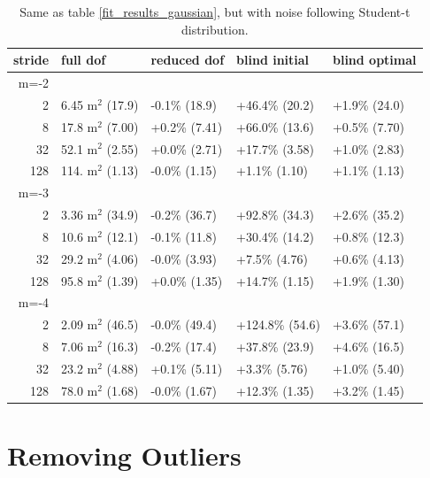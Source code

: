 \documentclass[10pt,journal]{IEEEtran}
\begin{document}
\begin{table}[ht]
\caption{Same as table \ref{fit_results_gaussian}, but with noise following Student-t distribution.}
\label{fit_results_tdistribution}
\centering
\begin{tabular}{r | llll} stride & full dof & reduced dof & blind initial & blind optimal \\ \hline \hline 
m=-2 &&&&  \\ \hline 
2 & 6.45 m$^2$ (17.9) &  -0.1\% (18.9) &  +46.4\% (20.2) &  +1.9\% (24.0) \\ 
8 & 17.8 m$^2$ (7.00) &  +0.2\% (7.41) &  +66.0\% (13.6) &  +0.5\% (7.70) \\ 
32 & 52.1 m$^2$ (2.55) &  +0.0\% (2.71) &  +17.7\% (3.58) &  +1.0\% (2.83) \\ 
128 & 114. m$^2$ (1.13) &  -0.0\% (1.15) &  +1.1\% (1.10) &  +1.1\% (1.13) \\ 
m=-3 &&&&  \\ \hline 
2 & 3.36 m$^2$ (34.9) &  -0.2\% (36.7) &  +92.8\% (34.3) &  +2.6\% (35.2) \\ 
8 & 10.6 m$^2$ (12.1) &  -0.1\% (11.8) &  +30.4\% (14.2) &  +0.8\% (12.3) \\ 
32 & 29.2 m$^2$ (4.06) &  -0.0\% (3.93) &  +7.5\% (4.76) &  +0.6\% (4.13) \\ 
128 & 95.8 m$^2$ (1.39) &  +0.0\% (1.35) &  +14.7\% (1.15) &  +1.9\% (1.30) \\ 
m=-4 &&&&  \\ \hline 
2 & 2.09 m$^2$ (46.5) &  -0.0\% (49.4) &  +124.8\% (54.6) &  +3.6\% (57.1) \\ 
8 & 7.06 m$^2$ (16.3) &  -0.2\% (17.4) &  +37.8\% (23.9) &  +4.6\% (16.5) \\ 
32 & 23.2 m$^2$ (4.88) &  +0.1\% (5.11) &  +3.3\% (5.76) &  +1.0\% (5.40) \\ 
128 & 78.0 m$^2$ (1.68) &  -0.0\% (1.67) &  +12.3\% (1.35) &  +3.2\% (1.45) \\ 
\end{tabular} 

\end{table}



\section{Removing Outliers}
\label{sec:outliers}
\end{document}

